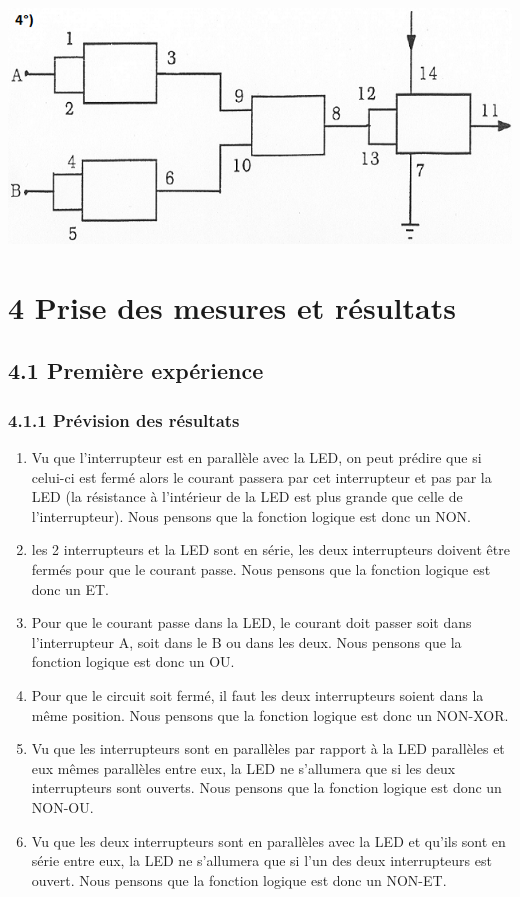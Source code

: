 \documentclass{report}
\begin{document}
\includegraphics[scale=1]{CirInt5.png} 
\newpage

\section*{4 Prise des mesures et résultats}
\subsection*{4.1 Premi\`ere exp\'erience}
\subsubsection*{4.1.1 Pr\'evision des r\'esultats}
\begin{enumerate}
\item Vu que l'interrupteur est en parall\`ele avec la LED, on peut pr\'edire que si celui-ci est ferm\'e alors le courant passera par cet interrupteur et pas par la LED (la résistance à l'intérieur de la LED est plus grande que celle de l'interrupteur). Nous pensons que la fonction logique est donc un NON.
\item les 2 interrupteurs et la LED sont en série, les deux interrupteurs doivent \^etre ferm\'es pour que le courant passe. Nous pensons que la fonction logique est donc un ET.
\item Pour que le courant passe dans la LED, le courant doit passer soit dans l'interrupteur A, soit dans le B ou dans les deux. Nous pensons que la fonction logique est donc un OU.
\item Pour que le circuit soit ferm\'e, il faut les deux interrupteurs soient dans la m\^eme position. Nous pensons que la fonction logique est donc un NON-XOR.
\item Vu que les interrupteurs sont en parall\`eles par rapport \`a la LED parall\`eles et eux mêmes parallèles entre eux, la LED ne s'allumera que si les deux interrupteurs sont ouverts. Nous pensons que la fonction logique est donc un NON-OU.
\item Vu que les deux interrupteurs sont en parallèles avec la LED et qu'ils sont en s\'erie entre eux, la LED ne s'allumera que si l'un des deux interrupteurs est ouvert. Nous pensons que la fonction logique est donc un NON-ET.
\end{enumerate}
\end{document}

